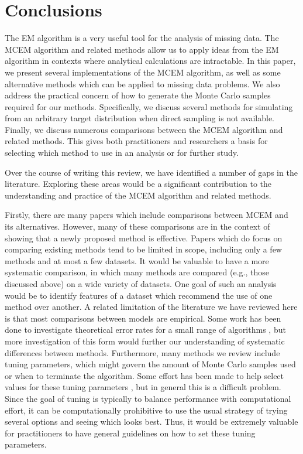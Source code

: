 \documentclass[11pt, oneside]{article}   	%
\begin{document}
\section{Conclusions}
\label{sec:conc}

The EM algorithm is a very useful tool for the analysis of missing data. The MCEM algorithm and related methods allow us to apply ideas from the EM algorithm in contexts where analytical calculations are intractable. In this paper, we present several implementations of the MCEM algorithm, as well as some alternative methods which can be applied to missing data problems. We also address the practical concern of how to generate the Monte Carlo samples required for our methods. Specifically, we discuss several methods for simulating from an arbitrary target distribution when direct sampling is not available. Finally, we discuss numerous comparisons between the MCEM algorithm and related methods. This gives both practitioners and researchers a basis for selecting which method to use in an analysis or for further study.

Over the course of writing this review, we have identified a number of gaps in the literature. Exploring these areas would be a significant contribution to the understanding and practice of the MCEM algorithm and related methods.

Firstly, there are many papers which include comparisons between MCEM and its alternatives. However, many of these comparisons are in the context of showing that a newly proposed method is effective. Papers which do focus on comparing existing methods tend to be limited in scope, including only a few methods and at most a few datasets. It would be valuable to have a more systematic comparison, in which many methods are compared (e.g., those discussed above) on a wide variety of datasets. One goal of such an analysis would be to identify features of a dataset which recommend the use of one method over another. A related limitation of the literature we have reviewed here is that most comparisons between models are empirical. Some work has been done to investigate theoretical error rates for a small range of algorithms \citep{Boo01, Jan03}, but more investigation of this form would further our understanding of systematic differences between methods. Furthermore, many methods we review include tuning parameters, which might govern the amount of Monte Carlo samples used or when to terminate the algorithm. Some effort has been made to help select values for these tuning parameters \citep[e.g.,][]{Jan06,Bae16}, but in general this is a difficult problem. Since the goal of tuning is typically to balance performance with computational effort, it can be computationally prohibitive to use the usual strategy of trying several options and seeing which looks best. Thus, it would be extremely valuable for practitioners to have general guidelines on how to set these tuning parameters.
\end{document}
